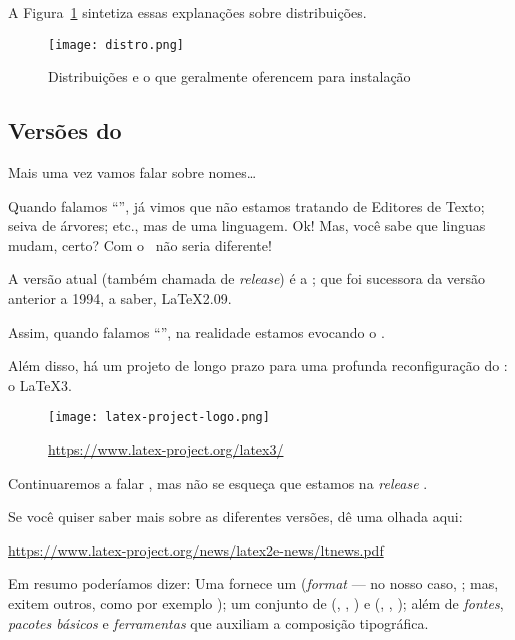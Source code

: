 A Figura~\ref{fig:distro} sintetiza essas explanações sobre distribuições. 

\begin{figure}[!htbp]
  \centering
    \texttt{[image: distro.png]}
  \caption{Distribuições e o que geralmente oferencem para instalação}
  \label{fig:distro}
\end{figure}

\subsection{Versões do \LaTeXX} %

Mais uma vez vamos falar sobre nomes\ldots {}

Quando falamos ``\LaTeXX'', já vimos que não estamos tratando de Editores de 
Texto; seiva de árvores; etc., mas de uma linguagem. 
Ok!
Mas, você sabe que linguas mudam, certo?
Com o \LaTeXX\ não seria diferente! 

A versão atual (também chamada de \textit{release}) é a 
{\grega {}}; que foi sucessora da versão anterior a 1994, a saber, 
{\grega \LaTeX 2.09}. 

Assim, quando falamos ``\LaTeXX'', na realidade estamos evocando o {\grega {}}. 

Além disso, há um projeto de longo prazo para uma profunda reconfiguração do 
\LaTeXX: o {\grega \LaTeX 3}. 

\begin{figure}[!htbp]
  \centering
    \texttt{[image: latex-project-logo.png]}
  \caption{\href{https://www.latex-project.org/latex3/}{https://www.latex-project.org/latex3/}}
\end{figure}

Continuaremos a falar \LaTeXX, mas não se esqueça que estamos na \textit{release} 
{\grega {}}. 

Se você quiser saber mais sobre as diferentes versões, dê uma olhada aqui: 

\begin{center}
  \footnotesize
  \url{https://www.latex-project.org/news/latex2e-news/ltnews.pdf}
\end{center}

Em resumo poderíamos dizer: 
Uma  fornece um  (\textit{format} --- no 
nosso caso, ; mas, exitem outros, como por exemplo 
); um conjunto de  (, 
, ) e  ({\grega{}}, 
{\grega{}}, {\grega {}}); além de \textit{fontes}, 
\textit{pacotes básicos} e \textit{ferramentas} que auxiliam a composição 
tipográfica. 

